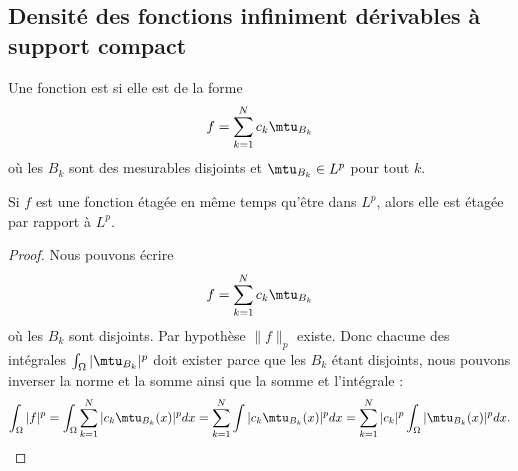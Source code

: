 \subsection{Densité des fonctions infiniment dérivables à support compact}

\begin{definition}
	Une fonction est  si elle est de la forme
	\begin{equation}
		f=\sum_{k=1}^Nc_k\mtu_{B_k}
	\end{equation}
	où les \( B_k\) sont des mesurables disjoints et \( \mtu_{B_k}\in L^p\) pour tout \( k\).
\end{definition}

\begin{lemma}   \label{LemWHIRdaX}
	Si \( f\) est une fonction étagée en même temps qu'être dans \( L^p\), alors elle est étagée par rapport à \( L^p\).
\end{lemma}

\begin{proof}
	Nous pouvons écrire
	\begin{equation}
		f=\sum_{k=1}^Nc_k\mtu_{B_k}
	\end{equation}
	où les \( B_k\) sont disjoints. Par hypothèse \( \| f \|_p\) existe. Donc chacune des intégrales \( \int_{\Omega}| \mtu_{B_k} |^p\) doit exister parce que les \( B_k\) étant disjoints, nous pouvons inverser la norme et la somme ainsi que la somme et l'intégrale :
	\begin{equation}
		\int_{\Omega}|f|^p=\int_{\Omega}\sum_{k=1}^N| c_k\mtu_{B_k}(x) |^pdx=\sum_{k=1}^N\int| c_k\mtu_{B_k}(x) |^pdx=\sum_{k=1}^N| c_k |^p\int_{\Omega}| \mtu_{B_k}(x) |^pdx.
	\end{equation}
\end{proof}

